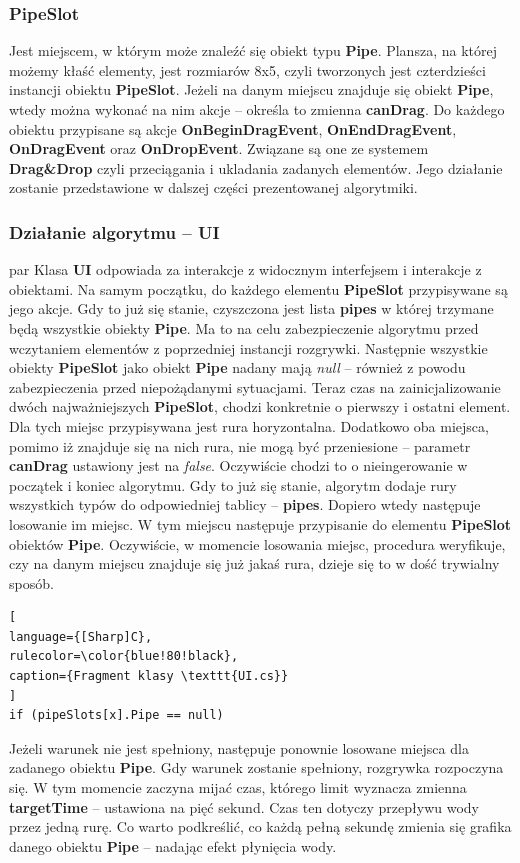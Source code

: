 \documentclass[oneside,polski,logo]{amuthesis}
\begin{document}
\subsubsection{PipeSlot}
\par Jest miejscem, w którym może znaleźć się obiekt typu \textbf{Pipe}. Plansza, na której możemy kłaść elementy, jest rozmiarów 8x5, czyli tworzonych jest czterdzieści instancji obiektu \textbf{PipeSlot}. Jeżeli na danym miejscu znajduje się obiekt \textbf{Pipe}, wtedy można wykonać na nim akcje – określa to zmienna \textbf{canDrag}. Do każdego obiektu przypisane są akcje \textbf{OnBeginDragEvent}, \textbf{OnEndDragEvent}, \textbf{OnDragEvent} oraz \textbf{OnDropEvent}. Związane są one ze systemem \textbf{Drag\&Drop} czyli przeciągania i ukladania zadanych elementów. Jego działanie zostanie przedstawione w dalszej części prezentowanej algorytmiki.
\subsubsection{Działanie algorytmu – UI}
par Klasa \textbf{UI} odpowiada za interakcje z widocznym interfejsem i interakcje z obiektami. Na samym początku, do każdego elementu \textbf{PipeSlot} przypisywane są jego akcje. Gdy to już się stanie, czyszczona jest lista \textbf{pipes} w której trzymane będą wszystkie obiekty \textbf{Pipe}. Ma to na celu zabezpieczenie algorytmu przed wczytaniem elementów z poprzedniej instancji rozgrywki. Następnie wszystkie obiekty \textbf{PipeSlot} jako obiekt \textbf{Pipe} nadany mają \emph{null} – również z powodu zabezpieczenia przed niepożądanymi sytuacjami. Teraz czas na zainicjalizowanie dwóch najważniejszych \textbf{PipeSlot}, chodzi konkretnie o pierwszy i ostatni element. Dla tych miejsc przypisywana jest rura horyzontalna. Dodatkowo oba miejsca, pomimo iż znajduje się na nich rura, nie mogą być przeniesione – parametr \textbf{canDrag} ustawiony jest na \emph{false}. Oczywiście chodzi to o nieingerowanie w początek i koniec algorytmu. Gdy to już się stanie, algorytm dodaje rury wszystkich typów do odpowiedniej tablicy – \textbf{pipes}. Dopiero wtedy następuje losowanie im miejsc. W tym miejscu następuje przypisanie do elementu \textbf{PipeSlot} obiektów \textbf{Pipe}. Oczywiście, w momencie losowania miejsc, procedura weryfikuje, czy na danym miejscu znajduje się już jakaś rura, dzieje się to w dość trywialny sposób.

\begin{lstlisting}[
language={[Sharp]C},
rulecolor=\color{blue!80!black},
caption={Fragment klasy \texttt{UI.cs}}
]
if (pipeSlots[x].Pipe == null)
\end{lstlisting}
Jeżeli warunek nie jest spełniony, następuje ponownie losowane miejsca dla zadanego obiektu \textbf{Pipe}. Gdy warunek zostanie spełniony, rozgrywka rozpoczyna się. W tym momencie zaczyna mijać czas, którego limit wyznacza zmienna \textbf{targetTime} – ustawiona na pięć sekund. Czas ten dotyczy przepływu wody przez jedną rurę. Co warto podkreślić, co każdą pełną sekundę zmienia się grafika danego obiektu \textbf{Pipe} – nadając efekt płynięcia wody.
\end{document}
